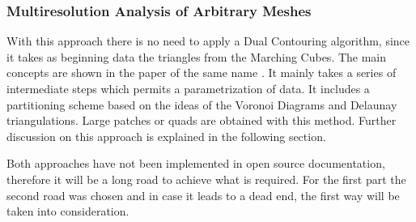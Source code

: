 \subsubsection{Multiresolution Analysis of Arbitrary Meshes}
With this approach there is no need to apply a Dual Contouring algorithm, since it takes as
beginning data the triangles from the Marching Cubes. The main concepts are shown in the paper
of the same name \cite{eck1996automatic}. It mainly takes a series of intermediate steps which permits a parametrization of data. It includes a partitioning scheme based on the ideas of the Voronoi Diagrams and Delaunay triangulations. Large patches or quads are obtained with this method. Further discussion on this approach is explained in the following section.


Both approaches have not been implemented in open source documentation, therefore it will be
a long road to achieve what is required. For the first part the second
road was chosen and in case it leads to a dead end, the first way will be taken into consideration.

